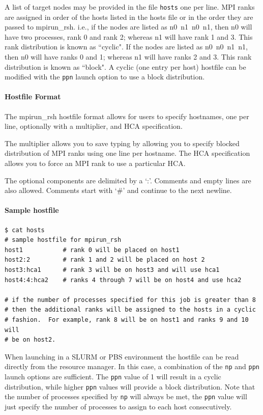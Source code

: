 A list of target nodes may be provided in the file \texttt{hosts}
one per line. MPI ranks are assigned in
order of the hosts listed in the hosts file or in the order they are
passed to mpirun\_rsh. i.e., if the nodes are listed as \mbox{n0 n1 n0
n1}, then n0 will have two processes, rank 0 and rank 2; whereas n1 will
have rank 1 and 3. This rank distribution is known as ``cyclic". If the
nodes are listed as \mbox{n0 n0 n1 n1}, then n0 will have ranks 0 and 1;
whereas n1 will have ranks 2 and 3. This rank distribution is known as
``block". A cyclic (one entry per host) hostfile can be modified with 
the \texttt{ppn} launch option to use a block distribution.

\paragraph{Hostfile Format\\}
The mpirun\_rsh hostfile format allows for users to specify hostnames, one per
line, optionally with a multiplier, and HCA specification.

The multiplier allows you to save typing by allowing you to specify blocked
distribution of MPI ranks using one line per hostname.  The HCA specification
allows you to force an MPI rank to use a particular HCA.

The optional components are delimited by a `:'.  Comments and empty lines are
also allowed.  Comments start with `\#' and continue to the next newline.

\paragraph{Sample hostfile}
\begin{verbatim}
$ cat hosts
# sample hostfile for mpirun_rsh
host1           # rank 0 will be placed on host1
host2:2         # rank 1 and 2 will be placed on host 2
host3:hca1      # rank 3 will be on host3 and will use hca1
host4:4:hca2    # ranks 4 through 7 will be on host4 and use hca2

# if the number of processes specified for this job is greater than 8
# then the additional ranks will be assigned to the hosts in a cyclic
# fashion.  For example, rank 8 will be on host1 and ranks 9 and 10 will
# be on host2.
\end{verbatim}

When launching in a SLURM or PBS environment the hostfile can be read 
directly from the resource manager. In this case, a combination of the
\texttt{np} and \texttt{ppn} launch options are sufficient. The \texttt{ppn}
value of 1 will result in a cyclic distribution, while higher \texttt{ppn}
values will provide a block distribution. Note that the number of processes
specified by \texttt{np} will always be met, the \texttt{ppn} value will just
specify the number of processes to assign to each host consecutively. 

